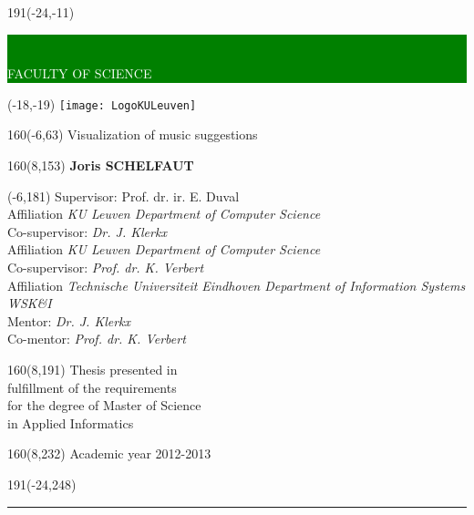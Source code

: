 \thispagestyle{empty}
\newcommand{\form}[1]{\scalebox{1.087}{\boldmath{#1}}}
\sffamily
%
\begin{textblock}{191}(-24,-11)
	\colorbox{green}{\hspace{139mm}\ \parbox[c][18truemm]{52mm}{\textcolor{white}{FACULTY OF SCIENCE}}}
\end{textblock}
%
\begin{textblock}{70}(-18,-19)
	\textblockcolour{}
	\texttt{[image: LogoKULeuven]}
\end{textblock}
%
\begin{textblock}{160}(-6,63)
	\textblockcolour{}
	\vspace{-\parskip}
	\flushleft
	\fontsize{40}{42}\selectfont \textcolor{bluetitle}{Visualization of music suggestions}\\[1.5mm]
	\fontsize{20}{22}\selectfont {A visual explanation system for collaborative filtering}
\end{textblock}

\begin{textblock}{160}(8,153)
\textblockcolour{}
\vspace{-\parskip}
\flushright
\fontsize{14}{16}\selectfont \textbf{Joris SCHELFAUT}
\end{textblock}
%
\begin{textblock}{90}(-6,181)
\textblockcolour{}
\vspace{-\parskip}
\flushleft
Supervisor: Prof. dr. ir. E. Duval\\[-2pt]
\textcolor{blueaff}{Affiliation \textsl{KU Leuven Department of Computer Science}}\\[5pt]
Co-supervisor: \textsl{Dr. J. Klerkx}\\[-2pt]
\textcolor{blueaff}{Affiliation \textsl{KU Leuven Department of Computer Science}}\\[5pt]
Co-supervisor: \textsl{Prof. dr. K. Verbert}\\[-2pt]
\textcolor{blueaff}{Affiliation \textsl{Technische Universiteit Eindhoven Department of Information Systems WSK\&I}}\\[5pt]
Mentor: \textsl{Dr. J. Klerkx}\\[-2pt]
Co-mentor: \textsl{Prof. dr. K. Verbert}\\[-2pt]
\end{textblock}
%
\begin{textblock}{160}(8,191)
\textblockcolour{}
\vspace{-\parskip}
\flushright
Thesis presented in\\[4.5pt]
fulfillment of the requirements\\[4.5pt]
for the degree of Master of Science\\[4.5pt]
in Applied Informatics\\
\end{textblock}
%
\begin{textblock}{160}(8,232)
\textblockcolour{}
\vspace{-\parskip}
\flushright
Academic year 2012-2013
\end{textblock}
%
\begin{textblock}{191}(-24,248)
{\color{blueline}\rule{550pt}{5.5pt}}
\end{textblock}
%
\vfill